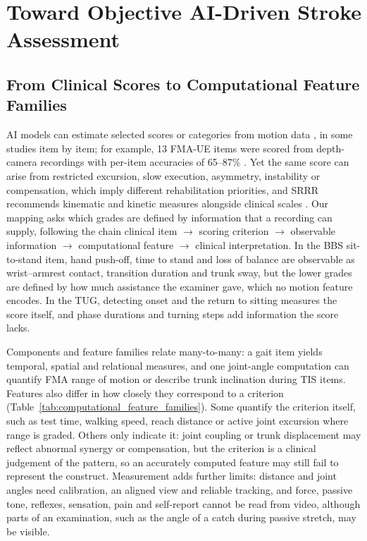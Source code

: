 \documentclass[11pt]{article}
\begin{document}

\clearpage

\section{Toward Objective AI-Driven Stroke Assessment}
\label{sec:framework}
\subsection{From Clinical Scores to Computational Feature Families}

AI models can estimate selected scores or categories from motion data \cite{Lee2021SmartphoneVideoAmbulation,Formstone2021IMUMMG,Zamin2023BIONICS,Li2017IMUEMGMotorEvaluation}, in some studies item by item; for example, 13 FMA-UE items were scored from depth-camera recordings with per-item accuracies of 65--87\% \cite{Kim2016KinectFMA}. Yet the same score can arise from restricted excursion, slow execution, asymmetry, instability or compensation, which imply different rehabilitation priorities, and SRRR recommends kinematic and kinetic measures alongside clinical scales \cite{CoreKwakkel2019SRRRUpperLimb,CoreVanCriekinge2024SRRRBalanceMobility}. Our mapping asks which grades are defined by information that a recording can supply, following the chain clinical item $\rightarrow$ scoring criterion $\rightarrow$ observable information $\rightarrow$ computational feature $\rightarrow$ clinical interpretation. In the BBS sit-to-stand item, hand push-off, time to stand and loss of balance are observable as wrist--armrest contact, transition duration and trunk sway, but the lower grades are defined by how much assistance the examiner gave, which no motion feature encodes. In the TUG, detecting onset and the return to sitting measures the score itself, and phase durations and turning steps add information the score lacks.

Components and feature families relate many-to-many: a gait item yields temporal, spatial and relational measures, and one joint-angle computation can quantify FMA range of motion or describe trunk inclination during TIS items. Features also differ in how closely they correspond to a criterion (Table~\ref{tab:computational_feature_families}). Some quantify the criterion itself, such as test time, walking speed, reach distance or active joint excursion where range is graded. Others only indicate it: joint coupling or trunk displacement may reflect abnormal synergy or compensation, but the criterion is a clinical judgement of the pattern, so an accurately computed feature may still fail to represent the construct. Measurement adds further limits: distance and joint angles need calibration, an aligned view and reliable tracking, and force, passive tone, reflexes, sensation, pain and self-report cannot be read from video, although parts of an examination, such as the angle of a catch during passive stretch, may be visible.
\end{document}
